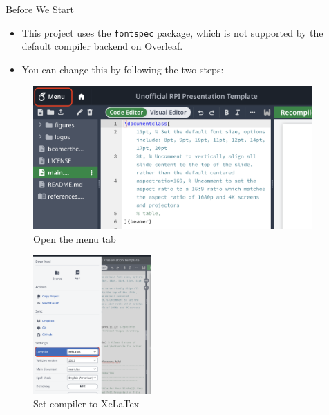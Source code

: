 \documentclass[
	10pt, %
	aspectratio=169, %
]{beamer}
\begin{document}
\begin{frame}{Before We Start}
	\begin{itemize}
		\item This project uses the \texttt{fontspec} package, which is not supported by the default compiler backend on Overleaf.
		\item You can change this by following the two steps:
	\end{itemize}
	\begin{minipage}[t]{0.48\textwidth}
		\begin{figure}
			\begin{center}
				\includegraphics[width=0.95\textwidth]{figures/overleaf-menu.png}
			\end{center}
			\caption{Open the menu tab}\label{fig:overleaf-menu}
		\end{figure}
	\end{minipage}%
	\begin{minipage}[t]{0.48\textwidth}
		\begin{figure}
			\begin{center}
				\includegraphics[width=0.4\textwidth]{figures/overleaf-compiler.png}
			\end{center}
			\caption{Set compiler to XeLaTex}\label{fig:overleaf-compiler}
		\end{figure}
	\end{minipage}%
\end{frame}
\end{document}
